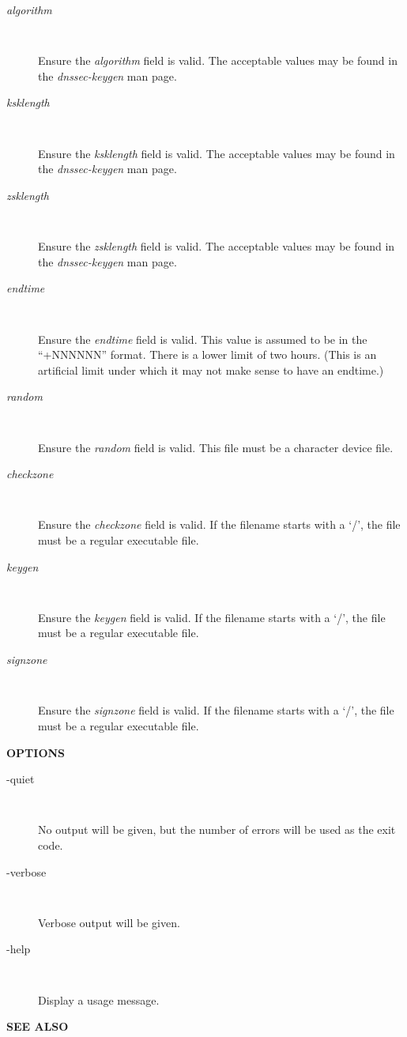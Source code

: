 \begin{description}

\item [{\it algorithm}]\verb" "

Ensure the {\it algorithm} field is valid.  The acceptable values may be found
in the {\it dnssec-keygen} man page.

\item [{\it ksklength}]\verb" "

Ensure the {\it ksklength} field is valid.  The acceptable values may be found
in the {\it dnssec-keygen} man page.

\item [{\it zsklength}]\verb" "

Ensure the {\it zsklength} field is valid.  The acceptable values may be found
in the {\it dnssec-keygen} man page.

\item [{\it endtime}]\verb" "

Ensure the {\it endtime} field is valid.  This value is assumed to be in the
``+NNNNNN'' format.  There is a lower limit of two hours.  (This is an
artificial limit under which it may not make sense to have an endtime.)

\item [{\it random}]\verb" "

Ensure the {\it random} field is valid.  This file must be a character
device file.

\item [{\it checkzone}]\verb" "

Ensure the {\it checkzone} field is valid.  If the filename starts with a `/',
the file must be a regular executable file.

\item [{\it keygen}]\verb" "

Ensure the {\it keygen} field is valid.  If the filename starts with a `/',
the file must be a regular executable file.

\item [{\it signzone}]\verb" "

Ensure the {\it signzone} field is valid.  If the filename starts with a `/',
the file must be a regular executable file.

\end{description}

{\bf OPTIONS}

\begin{description}

\item [-quiet]\verb" "

No output will be given, but the number of errors will be used as the
exit code.

\item [-verbose]\verb" "

Verbose output will be given.

\item [-help]\verb" "

Display a usage message.

\end{description}

{\bf SEE ALSO}


